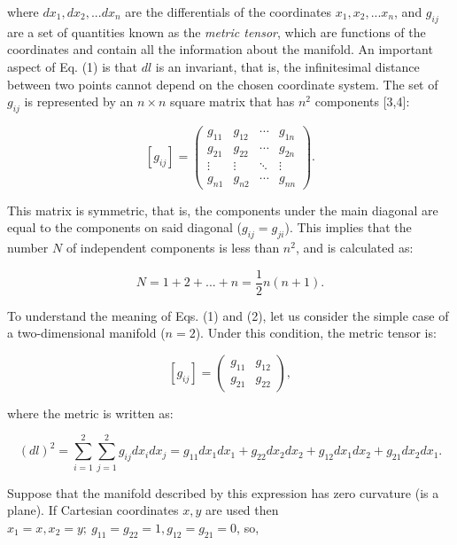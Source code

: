 \documentclass[11pt,letterpaper]{article}
\begin{document}
where $dx_{1}, dx_{2},... dx_{n}$ are the differentials of the coordinates $x_{1}, x_{2},... x_{n}$, and $g_{ij}$ are a set of quantities known as the \textit{metric tensor}, which are functions of the coordinates and contain all the information about the manifold. An important aspect of Eq. (1) is that $dl$ is an invariant, that is, the infinitesimal distance between two points cannot depend on the chosen coordinate system. The set of $g_{ij}$ is represented by an $n\times n$ square matrix that has $n^{2}$ components [3,4]:

\begin{equation} %
\left[g_{ij} \right]  = 
\begin{pmatrix}
g_{11} & g_{12} & \cdots & g_{1n} \\
g_{21} & g_{22} & \cdots & g_{2n} \\
\vdots  & \vdots  & \ddots & \vdots  \\
g_{n1} & g_{n2} & \cdots & g_{nn} 
\end{pmatrix}.
\end{equation}

This matrix is symmetric, that is, the components under the main diagonal are equal to the components on said diagonal ($g_{ij}=g_{ji}$). This implies that the number $N$ of independent components is less than $n^{2}$, and is calculated as:

\begin{equation}%
N = 1+2+... +n = \frac{1}{2} n(n+1).
\end{equation}

To understand the meaning of Eqs. (1) and (2), let us consider the simple case of a two-dimensional manifold ($n = 2$). Under this condition, the metric tensor is:

\begin{equation} %
\left[g_{ij} \right] = 
\begin{pmatrix}
g_{11} & g_{12}\\
g_{21} & g_{22} 
\end{pmatrix},
\end{equation}

where the metric is written as:

\begin{equation} %
(dl)^{2} = \sum_{i=1}^{2} \sum_{j=1}^{2} g_{ij} dx_{i} dx_{j} = g_{11}dx_{1}dx_{1} + g_{22}dx_{2}dx_{2} + g_{12}dx_{1}dx_{2} + g_{21}dx_{2}dx_{1}.
\end{equation}

Suppose that the manifold described by this expression has zero curvature (is a plane). If Cartesian coordinates $x,y$ are used then $x_{1} = x, x_{2}=y;\ g_{11}=g_{22}=1, g_{12}=g_{21}=0$, so,
\end{document}
